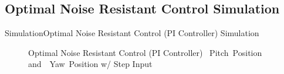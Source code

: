 \documentclass{beamer}
\begin{document}
\subsection{Optimal Noise Resistant Control Simulation}
\begin{frame}{Simulation}{Optimal Noise Resistant Control (PI Controller) Simulation}
    \begin{figure}
      \centering
      \caption{Optimal Noise Resistant Control (PI Controller) ~Pitch~Position and~~Yaw~Position w/ Step Input}
      \label{fig:LQG_PI_Sim_pos}
    \end{figure}
\end{frame}
\end{document}
